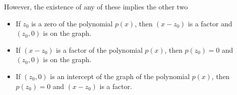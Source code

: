 \documentclass{ximera}
\begin{document}
However, the existence of any of these implies the other two






\begin{itemize}

\item If $z_0$ is a zero of the polynomial $p(x)$, then $(x-z_0)$ is a factor and $(z_0,0)$ is on the graph.


\item If $(x-z_0)$ is a factor of the polynomial $p(x)$, then $p(z_0)=0$ and $(z_0,0)$ is on the graph.


\item If $(z_0,0)$ is an intercept of the graph of the polynomial $p(x)$, then $p(z_0)=0$ and $(x-z_0)$ is a factor.

\end{itemize}
\end{document}
